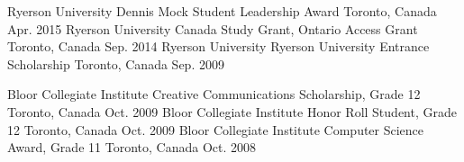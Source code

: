 \begin{cvhonors}
  \cvhonor
    {Ryerson University}
    {Dennis Mock Student Leadership Award}
    {Toronto, Canada}
    {Apr. 2015}
  \cvhonor
    {Ryerson University}
    {Canada Study Grant, Ontario Access Grant}
    {Toronto, Canada}
    {Sep. 2014}
  \cvhonor
    {Ryerson University}
    {Ryerson University Entrance Scholarship}
    {Toronto, Canada}
    {Sep. 2009}
\end{cvhonors}

\begin{cvhonors}
  \cvhonor
    {Bloor Collegiate Institute}
    {Creative Communications Scholarship, Grade 12}
    {Toronto, Canada}
    {Oct. 2009}
  \cvhonor
    {Bloor Collegiate Institute}
    {Honor Roll Student, Grade 12}
    {Toronto, Canada}
    {Oct. 2009}
  \cvhonor
    {Bloor Collegiate Institute}
    {Computer Science Award, Grade 11}
    {Toronto, Canada}
    {Oct. 2008}
\end{cvhonors}
